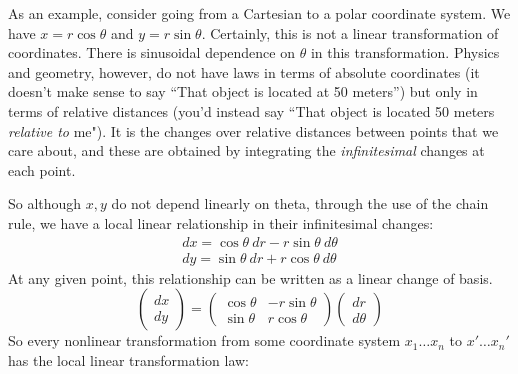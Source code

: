 \documentclass[../master.tex]{subfiles}
\begin{document}
	As an example, consider going from a Cartesian to a polar coordinate system. We have $x = r \cos \theta$ and $y = r \sin \theta$. Certainly, this is not a linear transformation of coordinates. There is sinusoidal dependence on $\theta$ in this transformation. Physics and geometry, however, do not have laws in terms of absolute coordinates (it doesn't make sense to say ``That object is located at 50 meters'') but only in terms of relative distances (you'd instead say ``That object is located 50 meters \emph{relative to} me"). It is the changes over relative distances between points that we care about, and these are obtained by integrating the \emph{infinitesimal} changes at each point. 
	
	So although $x,y$ do not depend linearly on theta, through the use of the chain rule, we have a local linear relationship in their infinitesimal changes:
	\begin{align*}
		dx = \cos \theta ~dr - r \sin \theta ~d\theta\\
		dy = \sin \theta ~dr + r \cos \theta ~d\theta
	\end{align*}
	At any given point, this relationship can be written as a linear change of basis.
	\begin{equation*}
		\begin{pmatrix}
			dx \\ dy
		\end{pmatrix}
		 = 
		 \begin{pmatrix}
		 	\cos \theta & - r \sin \theta \\
			\sin \theta & r \cos \theta
		 \end{pmatrix}
		 \begin{pmatrix}
		 	dr \\
			d\theta
		 \end{pmatrix}
	\end{equation*}
	So every nonlinear transformation from some coordinate system $x_1 \dots x_n$ to $x' \dots x_n'$ has the local linear transformation law:
\end{document}
